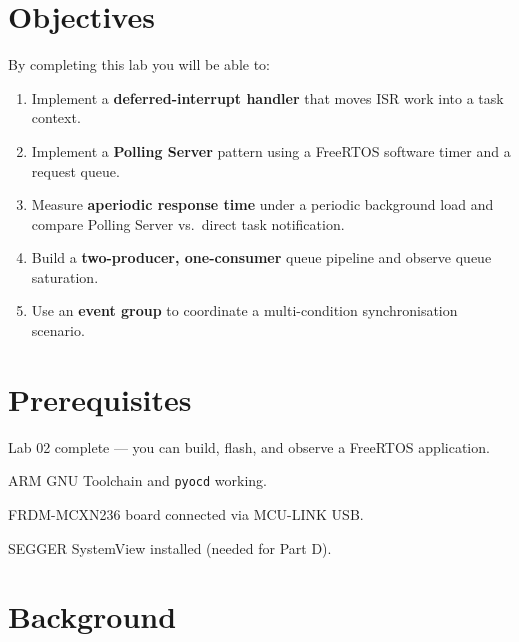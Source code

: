 \documentclass[11pt, a4paper]{article}
\begin{document}

\section{Objectives}

By completing this lab you will be able to:

\begin{enumerate}[noitemsep, leftmargin=*]
  \item Implement a \textbf{deferred-interrupt handler} that moves ISR work into a task context.
  \item Implement a \textbf{Polling Server} pattern using a FreeRTOS software timer and a
        request queue.
  \item Measure \textbf{aperiodic response time} under a periodic background load and compare
        Polling Server vs.\ direct task notification.
  \item Build a \textbf{two-producer, one-consumer} queue pipeline and observe queue
        saturation.
  \item Use an \textbf{event group} to coordinate a multi-condition synchronisation scenario.
\end{enumerate}

\section{Prerequisites}

\begin{checklist}
  \item Lab 02 complete --- you can build, flash, and observe a FreeRTOS application.
  \item ARM GNU Toolchain and \texttt{pyocd} working.
  \item FRDM-MCXN236 board connected via MCU-LINK USB.
  \item SEGGER SystemView installed (needed for Part D).
\end{checklist}

\section{Background}
\end{document}

